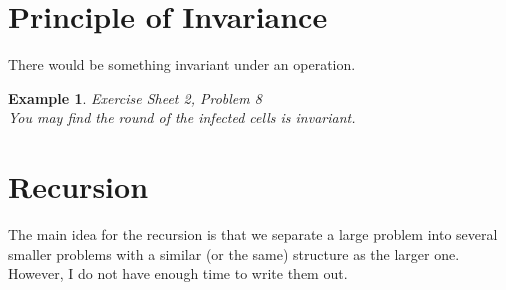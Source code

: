 \documentclass{article}
\newtheorem{example}{Example}[section]
\begin{document}
    \section{Principle of Invariance}
    There would be something invariant under an operation.
    \begin{example}
        Exercise Sheet 2, Problem 8\\
        You may find the round of the infected cells is invariant.
    \end{example}
    
    \section{Recursion}
    The main idea for the recursion is that we separate a large problem into several smaller problems with a similar (or the same) structure as the larger one. However, I do not have enough time to write them out.
\end{document}

